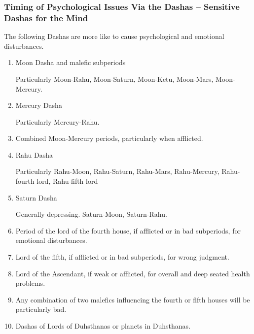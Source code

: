 \subsubsection{Timing of Psychological Issues Via the Dashas – Sensitive Dashas for the Mind}

 

The following Dashas are more like to cause psychological and emotional disturbances.

\begin{enumerate}

\item Moon Dasha and malefic subperiods

Particularly Moon-Rahu, Moon-Saturn, Moon-Ketu, Moon-Mars, Moon-Mercury.

 

\item Mercury Dasha

Particularly Mercury-Rahu.

 

\item Combined Moon-Mercury periods, particularly when afflicted.

 

\item Rahu Dasha

Particularly Rahu-Moon, Rahu-Saturn, Rahu-Mars, Rahu-Mercury, Rahu-fourth lord, Rahu-fifth lord

 

\item Saturn Dasha

Generally depressing. Saturn-Moon, Saturn-Rahu.

 

\item Period of the lord of the fourth house, if afflicted or in bad subperiods, for emotional disturbances.

 

\item Lord of the fifth, if afflicted or in bad subperiods, for wrong judgment.

 

\item Lord of the Ascendant, if weak or afflicted, for overall and deep seated health problems.

\item Any combination of two malefics influencing the fourth or fifth houses will be particularly bad.

 

\item  Dashas of Lords of Duhsthanas or planets in Duhsthanas.

 
\end{enumerate}
 

